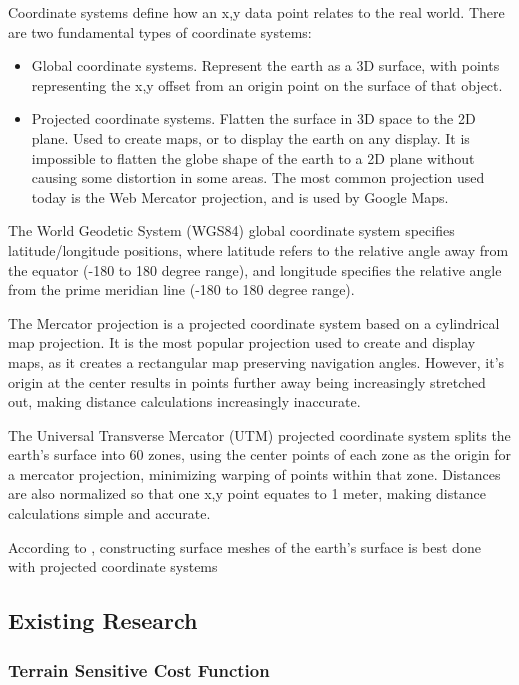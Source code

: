 \documentclass[12pt]{article}
\begin{document}
Coordinate systems define how an x,y data point relates to the real world. There are two fundamental types of coordinate systems:

\begin{itemize}
  \item Global coordinate systems. Represent the earth as a 3D surface, with points representing the x,y offset from an origin point on the surface of that object.
  \item Projected coordinate systems. Flatten the surface in 3D space to the 2D plane. Used to create maps, or to display the earth on any display. It is impossible to flatten the globe shape of the earth to a 2D plane without causing some distortion in some areas. The most common projection used today is the Web Mercator projection, and is used by Google Maps.
\end{itemize}

The World Geodetic System (WGS84) global coordinate system specifies latitude/longitude positions, where latitude refers to the relative angle away from the equator (-180 to 180 degree range), and longitude specifies the relative angle from the prime meridian line (-180 to 180 degree range).

The Mercator projection is a projected coordinate system based on a cylindrical map projection. It is the most popular projection used to create and display maps, as it creates a rectangular map preserving navigation angles. However, it's origin at the center results in points further away being increasingly stretched out, making distance calculations increasingly inaccurate.

The Universal Transverse Mercator (UTM) projected coordinate system splits the earth's surface into 60 zones, using the center points of each zone as the origin for a mercator projection, minimizing warping of points within that zone. Distances are also normalized so that one x,y point equates to 1 meter, making distance calculations simple and accurate.

According to \textcite{cgal:eb-24b}, constructing surface meshes of the earth's surface is best done with projected coordinate systems %

\subsection{Existing Research}

\subsubsection{Terrain Sensitive Cost Function}
\end{document}
